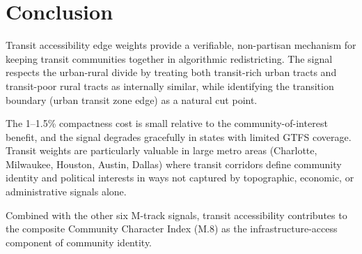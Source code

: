 \section{Conclusion}

Transit accessibility edge weights provide a verifiable, non-partisan mechanism for keeping transit communities together in algorithmic redistricting. The signal respects the urban-rural divide by treating both transit-rich urban tracts and transit-poor rural tracts as internally similar, while identifying the transition boundary (urban transit zone edge) as a natural cut point.

The 1--1.5\% compactness cost is small relative to the community-of-interest benefit, and the signal degrades gracefully in states with limited GTFS coverage. Transit weights are particularly valuable in large metro areas (Charlotte, Milwaukee, Houston, Austin, Dallas) where transit corridors define community identity and political interests in ways not captured by topographic, economic, or administrative signals alone.

Combined with the other six M-track signals, transit accessibility contributes to the composite Community Character Index (M.8) as the infrastructure-access component of community identity.
